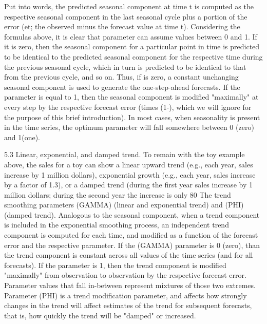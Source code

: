Put into words, the predicted seasonal component at time t is computed as the respective seasonal component in the last seasonal cycle plus a portion of the error (et; the observed minus the forecast value at time t). Considering the formulas above, it is clear that parameter  can assume values between 0 and 1. If it is zero, then the seasonal component for a particular point in time is predicted to be identical to the predicted seasonal component for the respective time during the previous seasonal cycle, which in turn is predicted to be identical to that from the previous cycle, and so on. Thus, if  is zero, a constant unchanging seasonal component is used to generate the one-step-ahead forecasts. If the  parameter is equal to 1, then the seasonal component is modified "maximally" at every step by the respective forecast error (times (1-), which we will ignore for the purpose of this brief introduction). In most cases, when seasonality is present in the time series, the optimum  parameter will fall somewhere between 0 (zero) and 1(one).


5.3 Linear, exponential, and damped trend. To remain with the toy example above, the sales for a toy can show a linear upward trend (e.g., each year, sales increase by 1 million dollars), exponential growth (e.g., each year, sales increase by a factor of 1.3), or a damped trend (during the first year sales increase by 1 million dollars; during the second year the increase is only 80%
The trend smoothing parameters (GAMMA) (linear and exponential trend) and (PHI) (damped trend). Analogous to the seasonal component, when a trend component is included in the exponential smoothing process, an independent trend component is computed for each time, and modified as a function of the forecast error and the respective parameter. If the (GAMMA)  parameter is 0 (zero), than the trend component is constant across all values of the time series (and for all forecasts). If the parameter is 1, then the trend component is modified "maximally" from observation to observation by the respective forecast error. Parameter values that fall in-between represent mixtures of those two extremes. Parameter (PHI)  is a trend modification parameter, and affects how strongly changes in the trend will affect estimates of the trend for subsequent forecasts, that is, how quickly the trend will be "damped" or increased.
 


